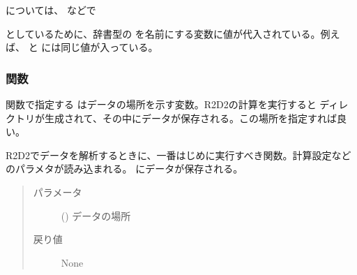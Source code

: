 \documentclass[letterpaper,10pt,dvipdfmx,report]{sphinxmanual}
\begin{document}
 については、 などで

\begin{sphinxVerbatim}[commandchars=\\\{\}]
   
       \PYG{l+s+s1}{R2D2.p[}\PYG{l+s+s1}{]}
\end{sphinxVerbatim}

としているために、辞書型の  を名前にする変数に値が代入されている。例えば、  と  には同じ値が入っている。


\subsubsection{関数}
\label{\detokenize{io:id5}}
関数で指定する  はデータの場所を示す変数。R2D2の計算を実行すると  ディレクトリが生成されて、その中にデータが保存される。この場所を指定すれば良い。

\begin{fulllineitems}
\label{\detokenize{io:R2D2.init}}
R2D2でデータを解析するときに、一番はじめに実行すべき関数。計算設定などのパラメタが読み込まれる。  にデータが保存される。
\begin{quote}\begin{description}
\item[{パラメータ}] \leavevmode
{} () \sphinxhyphen{}\sphinxhyphen{} データの場所

\item[{戻り値}] \leavevmode
None

\end{description}\end{quote}

\end{fulllineitems}
\end{document}

